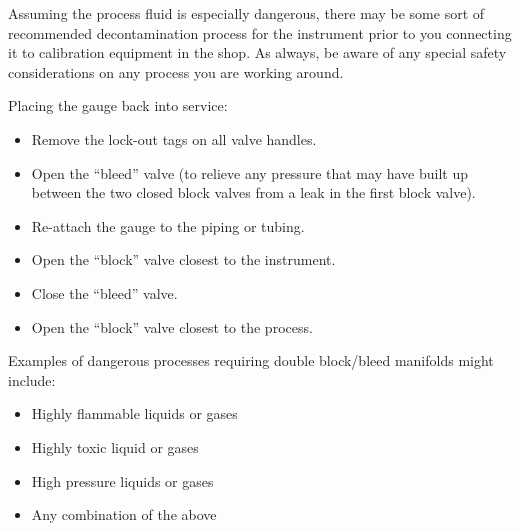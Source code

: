 Assuming the process fluid is especially dangerous, there may be some sort of recommended decontamination process for the instrument prior to you connecting it to calibration equipment in the shop.  As always, be aware of any special safety considerations on any process you are working around.

\vskip 10pt

Placing the gauge back into service:

\begin{itemize}
\item{} Remove the lock-out tags on all valve handles.
\item{} Open the ``bleed'' valve (to relieve any pressure that may have built up between the two closed block valves from a leak in the first block valve).
\item{} Re-attach the gauge to the piping or tubing.
\item{} Open the ``block'' valve closest to the instrument.
\item{} Close the ``bleed'' valve.
\item{} Open the ``block'' valve closest to the process.
\end{itemize}







Examples of dangerous processes requiring double block/bleed manifolds might include:

\begin{itemize}
\goodbreak
\item{} Highly flammable liquids or gases
\item{} Highly toxic liquid or gases
\item{} High pressure liquids or gases
\item{} Any combination of the above
\end{itemize}




